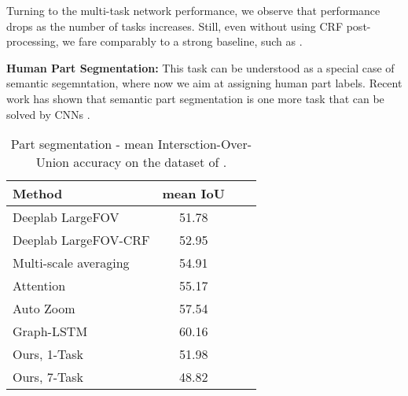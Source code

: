 \documentclass[10pt,twocolumn,letterpaper]{article}
\begin{document}
Turning to the multi-task network performance, we observe that performance drops as the number of tasks increases. Still, even without using CRF post-processing, we fare comparably to a strong baseline, such as \cite{papa15}. 





 \textbf{Human Part Segmentation:}  This task can be understood as a special case of  semantic segemntation, where now we aim at assigning human part labels. Recent work has shown that semantic part segmentation is one more task that can be solved by CNNs \cite{TsogkasSemanticPart15,HAZN,ChenYWXY15,LiangSFLY16,ChenPK0Y16}.

 
 \begin{table}[!h]
 	\begin{tabular}{|l|c|c|c|}
 		\hline
 		Method & mean IoU \\\hline\hline
 		Deeplab LargeFOV \cite{HAZN} & 51.78\\\hline
 		Deeplab LargeFOV-CRF\cite{HAZN} & 52.95 \\\hline
 		Multi-scale averaging \cite{ChenYWXY15} & 54.91 \\\hline
 		Attention \cite{ChenYWXY15} & 55.17\\\hline
 		Auto Zoom  \cite{HAZN} & 57.54\\\hline
 		Graph-LSTM \cite{LiangSFLY16} & 60.16\\\hline
 		Ours, 1-Task & 51.98\\\hline
 		Ours, 7-Task & 48.82 \\\hline
 	\end{tabular}
 	\caption{Part segmentation - mean Intersction-Over-Union accuracy on the dataset of \cite{chen_cvpr14}. \label{table:results_e}}
 \end{table}
 
\end{document}
